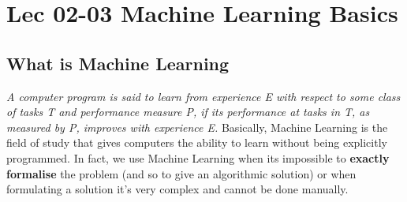 \chapter{Lec 02-03 Machine Learning Basics}

\section{What is Machine Learning}
\textit{A computer program is said to learn from experience E with respect to some class of tasks T and performance measure P, if its performance at tasks in T, as measured by P, improves with experience E.} Basically, Machine Learning is the field of study that gives computers the ability to learn without being explicitly programmed. In fact, we use Machine Learning when its impossible to \textbf{exactly formalise} the problem (and so to give an algorithmic solution) or when formulating a solution it's very complex and cannot be done manually.
